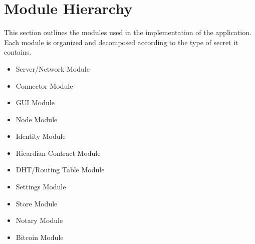 \documentclass{article}
\begin{document}
\section*{Module Hierarchy}
This section outlines the modules used in the implementation of the application. Each module is organized and decomposed according to the type of secret it contains.
\begin{itemize}
\item
Server/Network Module
\item
Connector Module
\item
GUI Module
\item
Node Module
\item
Identity Module
\item
Ricardian Contract Module
\item
DHT/Routing Table Module
\item
Settings Module
\item
Store Module
\item
Notary Module
\item
Bitcoin Module
\end{itemize}
\end{document}
